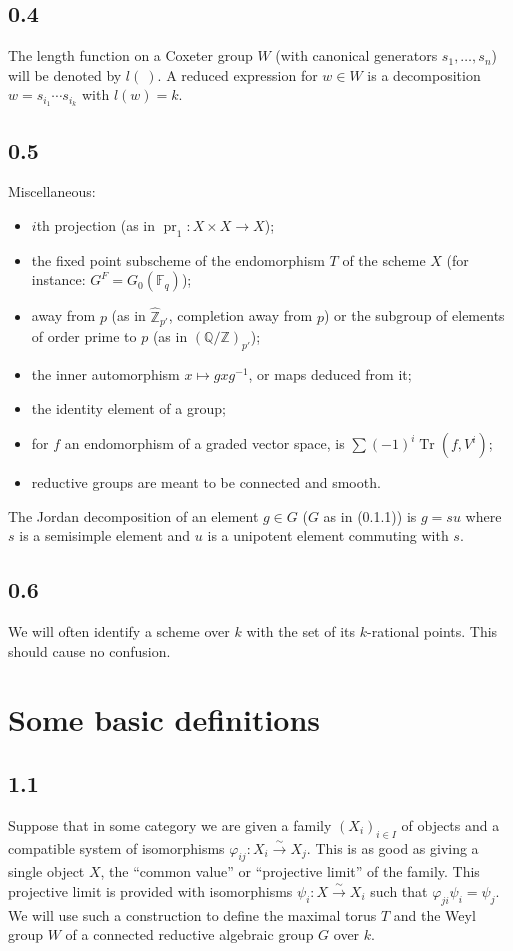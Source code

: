 \documentclass[11pt]{amsart}
\theoremstyle{plain}
\theoremstyle{remark}
\DeclareMathOperator{\Tr}{Tr}
\DeclareMathOperator{\pr}{pr}
\DeclareMathOperator{\ad}{ad}
\begin{document}
\subsection*{0.4} The length function on a Coxeter group $W$ (with canonical generators $s_1, \dots, s_n$) will be denoted by $l(\ )$. A reduced expression for $w \in W$ is a decomposition $w = s_{i_1} \cdots s_{i_k}$ with $l(w) = k$.

\subsection*{0.5} Miscellaneous:
\begin{itemize}
\item[$\pr_i$:] $i$th projection (as in $\pr_1: X \times X \to X$);
\item[$X^T$:] the fixed point subscheme of the endomorphism $T$ of the scheme $X$ (for instance: $G^F = G_0(\mathbb{F}_q)$);
\item[$p'$ (in index):] away from $p$ (as in $\hat{\mathbb{Z}}_{p'}$, completion away from $p$) or the subgroup of elements of order prime to $p$ (as in $(\mathbb{Q}/\mathbb{Z})_{p'}$);
\item[$\ad g$:] the inner automorphism $x \mapsto gxg^{-1}$, or maps deduced from it;
\item[$1$ or $e$:] the identity element of a group;
\item[$\Tr(f, V^*)$,] for $f$ an endomorphism of a graded vector space, is $\sum (-1)^i \Tr(f, V^i)$;
\item[reductive:] reductive groups are meant to be connected and smooth.
\end{itemize}

The Jordan decomposition of an element $g \in G$ ($G$ as in (0.1.1)) is $g = su$ where $s$ is a semisimple element and $u$ is a unipotent element commuting with $s$.

\subsection*{0.6} We will often identify a scheme over $k$ with the set of its $k$-rational points. This should cause no confusion.

\section{Some basic definitions}

\subsection{1.1} Suppose that in some category we are given a family $(X_i)_{i \in I}$ of objects and a compatible system of isomorphisms $\varphi_{ij}: X_i \xrightarrow{\sim} X_j$. This is as good as giving a single object $X$, the ``common value'' or ``projective limit'' of the family. This projective limit is provided with isomorphisms $\psi_i: X \xrightarrow{\sim} X_i$ such that $\varphi_{ji}\psi_i = \psi_j$. We will use such a construction to define the maximal torus $T$ and the Weyl group $W$ of a connected reductive algebraic group $G$ over $k$.
\end{document}
